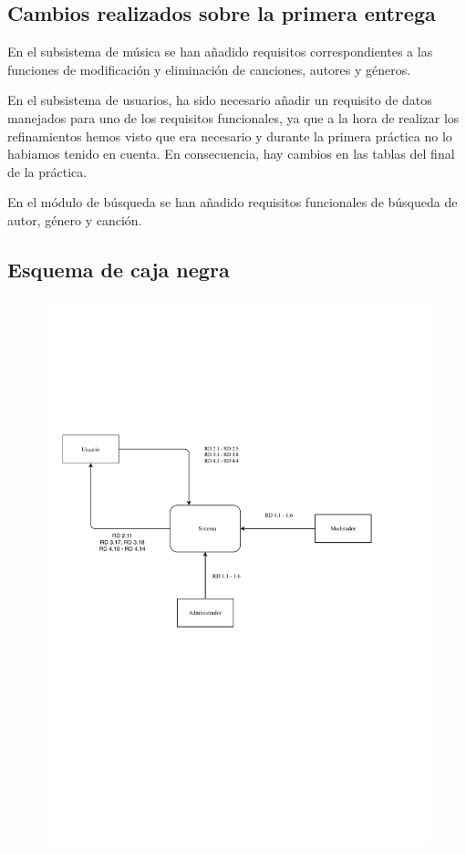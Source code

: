 \subsection{Cambios realizados sobre la primera entrega}

En el subsistema de música se han añadido requisitos correspondientes a las funciones de modificación y eliminación de canciones, autores y géneros.

En el subsistema de usuarios, ha sido necesario añadir un requisito de datos manejados para uno de los requisitos funcionales, ya que a la hora de realizar los refinamientos hemos visto que era necesario y durante la primera práctica no lo habiamos tenido en cuenta. En consecuencia, hay cambios en las tablas del final de la práctica.

En el módulo de búsqueda se han añadido requisitos funcionales de búsqueda de autor, género y canción.

\subsection{Esquema de caja negra}

\begin{figure}[H]
  \centering
  \includegraphics{diagramas/Caja_negra.pdf}
\end{figure}

